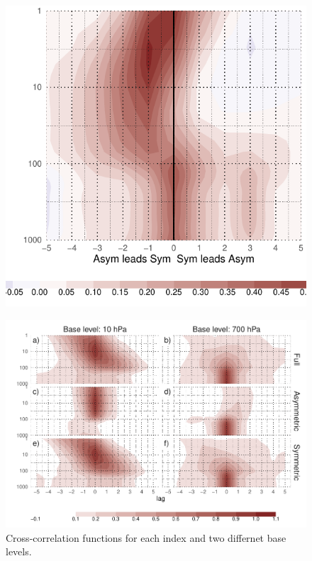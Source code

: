 \documentclass[twocol]{ametsocV5}
\begin{document}

\begin{figure}
\includegraphics{A1-1} \label{fig:A1}
\end{figure}

\begin{figure}
\includegraphics{A2 ccf-levels-1} \caption[Cross-correlation functions for each index and two differnet base levels]{Cross-correlation functions for each index and two differnet base levels.}\label{fig:A2 ccf-levels}
\end{figure}
\end{document}
